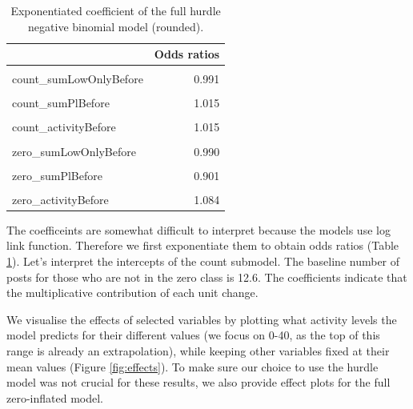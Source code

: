\documentclass[a4paper,fleqn]{cas-dc}
\begin{document}
\begin{table}
\centering\begingroup\fontsize{9}{11}\selectfont
\begin{tabular}{lr}
\toprule
  & Odds ratios\\
\midrule
\cellcolor{gray!6}{count\_(Intercept)} & \cellcolor{gray!6}{12.606}\\
count\_sumLowOnlyBefore & 0.991\\
\cellcolor{gray!6}{count\_sumHighBefore} & \cellcolor{gray!6}{0.992}\\
count\_sumPlBefore & 1.015\\
\cellcolor{gray!6}{count\_sumPhBefore} & \cellcolor{gray!6}{0.870}\\
\addlinespace
count\_activityBefore & 1.015\\
\cellcolor{gray!6}{zero\_(Intercept)} & \cellcolor{gray!6}{1.634}\\
zero\_sumLowOnlyBefore & 0.990\\
\cellcolor{gray!6}{zero\_sumHighBefore} & \cellcolor{gray!6}{0.894}\\
zero\_sumPlBefore & 0.901\\
\addlinespace
\cellcolor{gray!6}{zero\_sumPhBefore} & \cellcolor{gray!6}{1.156}\\
zero\_activityBefore & 1.084\\
\bottomrule
\end{tabular}
\endgroup{}
\caption{Exponentiated coefficient of the full hurdle negative binomial model (rounded).}
\label{tab:exphnb}
\end{table}



The coefficeints are somewhat difficult to interpret because the models
use log link function. Therefore we first exponentiate them to obtain
odds ratios (Table \ref{tab:exphnb}). Let's interpret the intercepts of
the count submodel. The baseline number of posts for those who are not
in the zero class is 12.6. The coefficients indicate that the
multiplicative contribution of each unit change.

We visualise the effects of selected variables by plotting what activity
levels the model predicts for their different values (we focus on 0-40,
as the top of this range is already an extrapolation), while keeping
other variables fixed at their mean values (Figure \ref{fig:effects}). 
To make sure our choice to use the hurdle model was not crucial for
these results, we also provide effect plots for the full zero-inflated
model.
\end{document}
